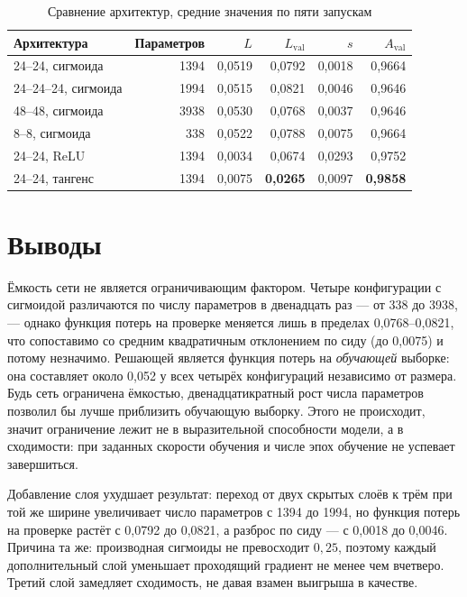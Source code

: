 \begin{table}[htbp]
\caption{Сравнение архитектур, средние значения по пяти запускам}
\label{tab:architectures}
\begin{center}
\begin{tabular}{|l|r|r|r|r|r|}
\hline
Архитектура & Параметров & $L$ & $L_{\text{val}}$ & $s$ & $A_{\text{val}}$ \\
\hline
24--24, сигмоида      & 1394 & 0,0519 & 0,0792 & 0,0018 & 0,9664 \\
24--24--24, сигмоида  & 1994 & 0,0515 & 0,0821 & 0,0046 & 0,9646 \\
48--48, сигмоида      & 3938 & 0,0530 & 0,0768 & 0,0037 & 0,9646 \\
8--8, сигмоида        &  338 & 0,0522 & 0,0788 & 0,0075 & 0,9664 \\
24--24, ReLU          & 1394 & 0,0034 & 0,0674 & 0,0293 & 0,9752 \\
24--24, тангенс       & 1394 & 0,0075 & \textbf{0,0265} & 0,0097 & \textbf{0,9858} \\
\hline
\end{tabular}
\end{center}
\end{table}

\section{Выводы}

Ёмкость сети не является ограничивающим фактором. Четыре конфигурации с
сигмоидой различаются по числу параметров в двенадцать раз --- от 338 до 3938, --- однако
функция потерь на проверке меняется лишь в пределах 0,0768--0,0821, что сопоставимо со
средним квадратичным отклонением по сиду (до 0,0075) и потому незначимо. Решающей
является функция потерь на \emph{обучающей} выборке: она составляет около 0,052 у всех
четырёх конфигураций независимо от размера. Будь сеть ограничена ёмкостью,
двенадцатикратный рост числа параметров позволил бы лучше приблизить обучающую выборку.
Этого не происходит, значит ограничение лежит не в выразительной способности модели, а в
сходимости: при заданных скорости обучения и числе эпох обучение не успевает завершиться.

Добавление слоя ухудшает результат: переход от двух скрытых слоёв к трём при
той же ширине увеличивает число параметров с 1394 до 1994, но функция потерь на проверке
растёт с 0,0792 до 0,0821, а разброс по сиду --- с 0,0018 до 0,0046. Причина та же:
производная сигмоиды не превосходит $0{,}25$, поэтому каждый дополнительный слой
уменьшает проходящий градиент не менее чем вчетверо. Третий слой замедляет сходимость, не
давая взамен выигрыша в качестве.

